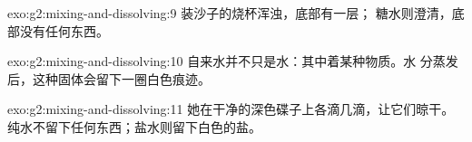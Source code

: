 \begin{solution}{exo:g2:mixing-and-dissolving:9}
装沙子的烧杯浑浊，底部有一层；
糖水则澄清，底部没有任何东西。
\end{solution}

\begin{solution}{exo:g2:mixing-and-dissolving:10}
自来水并不只是水：其中着某种物质。水
分蒸发后，这种固体会留下一圈白色痕迹。
\end{solution}

\begin{solution}{exo:g2:mixing-and-dissolving:11}
她在干净的深色碟子上各滴几滴，让它们晾干。
纯水不留下任何东西；盐水则留下白色的盐。
\end{solution}
